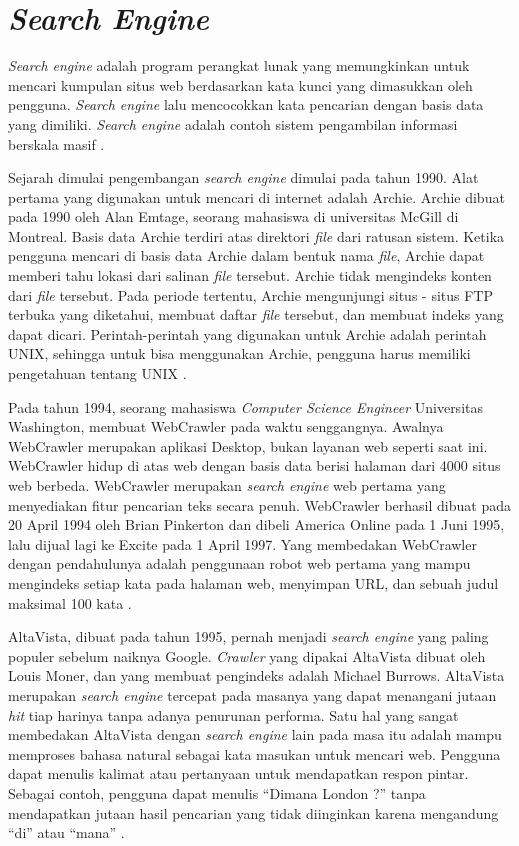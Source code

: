 \section{\textit{Search Engine}}

\textit{Search engine} adalah program perangkat lunak yang memungkinkan untuk mencari kumpulan situs web berdasarkan kata kunci yang dimasukkan oleh pengguna. \textit{Search engine} lalu mencocokkan kata pencarian dengan basis data yang dimiliki. \textit{Search engine} adalah contoh sistem pengambilan informasi berskala masif \citep{seymour2011}.

Sejarah dimulai pengembangan \textit{search engine} dimulai pada tahun 1990. Alat pertama yang digunakan untuk mencari di internet adalah Archie. Archie dibuat pada 1990 oleh Alan Emtage, seorang mahasiswa di universitas McGill di Montreal. Basis data Archie terdiri atas direktori \textit{file} dari ratusan sistem. Ketika pengguna mencari di basis data Archie dalam bentuk nama \textit{file}, Archie dapat memberi tahu lokasi dari salinan \textit{file} tersebut. Archie tidak mengindeks konten dari \textit{file} tersebut. Pada periode tertentu, Archie mengunjungi situs - situs FTP terbuka yang diketahui, membuat daftar \textit{file} tersebut, dan membuat indeks yang dapat dicari. Perintah-perintah yang digunakan untuk Archie adalah perintah UNIX, sehingga untuk bisa menggunakan Archie, pengguna harus memiliki pengetahuan tentang UNIX \citep{seymour2011}.

Pada tahun 1994, seorang mahasiswa \textit{Computer Science Engineer} Universitas Washington, membuat WebCrawler pada waktu senggangnya. Awalnya WebCrawler merupakan aplikasi Desktop, bukan layanan web seperti saat ini. WebCrawler hidup di atas web dengan basis data berisi halaman dari 4000 situs web berbeda. WebCrawler merupakan \textit{search engine} web pertama yang menyediakan fitur pencarian teks secara penuh. WebCrawler berhasil dibuat pada 20 April 1994 oleh Brian Pinkerton dan dibeli America Online pada 1 Juni 1995, lalu dijual lagi ke Excite pada 1 April 1997. Yang membedakan WebCrawler dengan pendahulunya adalah penggunaan robot web pertama yang mampu mengindeks setiap kata pada halaman web, menyimpan URL, dan sebuah judul maksimal 100 kata \citep{seymour2011}.

AltaVista, dibuat pada tahun 1995, pernah menjadi \textit{search engine} yang paling populer sebelum naiknya Google. \textit{Crawler} yang dipakai AltaVista dibuat oleh Louis Moner, dan yang membuat pengindeks adalah Michael Burrows. AltaVista merupakan \textit{search engine} tercepat pada masanya yang dapat menangani jutaan \textit{hit} tiap harinya tanpa adanya penurunan performa. Satu hal yang sangat membedakan AltaVista dengan \textit{search engine} lain pada masa itu adalah mampu memproses bahasa natural sebagai kata masukan untuk mencari web. Pengguna dapat menulis kalimat atau pertanyaan untuk mendapatkan respon pintar. Sebagai contoh, pengguna dapat menulis “Dimana London ?” tanpa mendapatkan jutaan hasil pencarian yang tidak diinginkan karena mengandung “di” atau “mana” \citep{seymour2011}.

